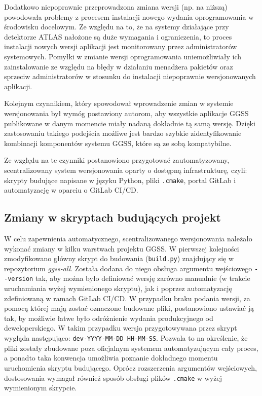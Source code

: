 Dodatkowo niepoprawnie przeprowadzona zmiana wersji (np. na niższą) powodowała problemy z procesem instalacji nowego wydania oprogramowania w środowisku docelowym. Ze względu na to, że na systemy działające przy detektorze ATLAS nałożone są duże wymagania i ograniczenia, to proces instalacji nowych wersji aplikacji jest monitorowany przez administratorów systemowych. Pomyłki w zmianie wersji oprogramowania uniemożliwiały ich zainstalowanie ze względu na błędy w działaniu menadżera pakietów oraz sprzeciw administratorów w stosunku do instalacji niepoprawnie wersjonowanych aplikacji.

Kolejnym czynnikiem, który spowodował wprowadzenie zmian w systemie wersjonowania był wymóg postawiony autorom, aby wszystkie aplikacje GGSS publikowane w danym momencie miały nadaną dokładnie tą samą wersję. Dzięki zastosowaniu takiego podejścia możliwe jest bardzo szybkie zidentyfikowanie kombinacji komponentów systemu GGSS, które są ze sobą kompatybilne.

Ze względu na te czynniki postanowiono przygotować zautomatyzowany, scentralizowany system wersjonowania oparty o dostępną infrastrukturę, czyli: skrypty budujące napisane w języku Python, pliki \lstinline{.cmake}, portal GitLab i automatyzację w oparciu o GitLab CI/CD.

\subsection{Zmiany w skryptach budujących projekt}
W celu zapewnienia automatycznego, scentralizowanego wersjonowania należało wykonać zmiany w kilku warstwach projektu GGSS. W pierwszej kolejności zmodyfikowano główny skrypt do budowania (\lstinline{build.py}) znajdujący się w repozytorium \emph{ggss-all}. Została dodana do niego obsługa argumentu wejściowego \lstinline{--version} tak, aby można było definiować wersję zarówno manualnie (w trakcie uruchamiania wyżej wymienionego skryptu), jak i poprzez automatyzację zdefiniowaną w ramach GitLab CI/CD. W przypadku braku podania wersji, za pomocą której mają zostać oznaczone budowane pliki, postanowiono ustawiać ją tak, by możliwie łatwe było odróżnienie wydania produkcyjnego od deweloperskiego. W takim przypadku wersja przygotowywana przez skrypt wygląda następująco: \lstinline{dev-YYYY-MM-DD_HH-MM-SS}. Pozwala to na określenie, że pliki zostały zbudowane poza oficjalnym systemem automatyzującym cały proces, a ponadto taka konwencja umożliwia poznanie dokładnego momentu uruchomienia skryptu budującego. Oprócz rozszerzenia argumentów wejściowych, dostosowania wymagał również sposób obsługi plików \lstinline{.cmake} w wyżej wymienionym skrypcie. 

